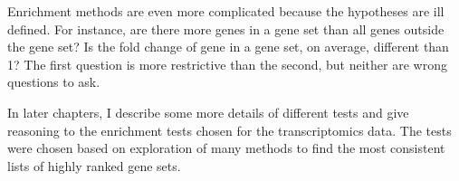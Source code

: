 Enrichment methods are even more complicated because the hypotheses
are ill defined. For instance, are there more genes in a gene set
than all genes outside the gene set? Is the fold change of gene
in a gene set, on average, different than 1? The first question
is more restrictive than the second, but neither are wrong questions
to ask.

In later chapters, I describe some more details of different tests
and give reasoning to the enrichment tests chosen for
the transcriptomics data. The tests were chosen based on exploration
of many methods to find the most consistent lists of highly ranked
gene sets. 












